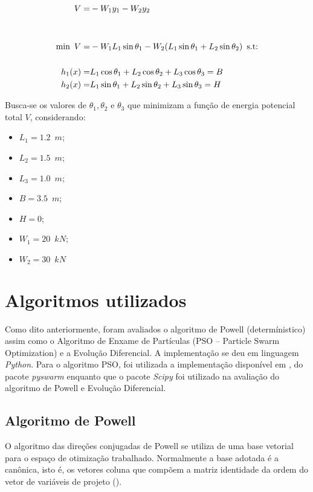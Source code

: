 \documentclass{article}
\begin{document}
\begin{equation}
\begin{split}
V = & -W_1 y_1 - W_2 y_2 \\
\phantom{0} & \phantom{0} \\
\phantom{0} & \phantom{0} \\
\text{min\phantom{0}}V = & -W_1 L_1 \sin \theta_1 - W_2 (L_1 \sin \theta_1 + L_2 \sin \theta_2) \phantom{0}\text{s.t:} \\
\phantom{0} & \phantom{0} \\
h_1(x) = & L_1 \cos \theta_1 + L_2 \cos \theta_2 + L_3 \cos \theta_3  = B \\
h_2(x) = & L_1 \sin \theta_1 + L_2 \sin \theta_2 + L_3 \sin \theta_3  = H \\
\end{split}
\end{equation}

Busca-se os valores de $\theta_1, \theta_2$ e $\theta_3$ que minimizam a função de energia potencial total $V$, considerando:

\begin{itemize}
\item $L_1 = 1.2 \phantom{0} m$;
\item $L_2 = 1.5 \phantom{0} m$;
\item $L_3 = 1.0 \phantom{0} m$;
\item $B = 3.5 \phantom{0} m$;
\item $H = 0$;
\item $W_1 = 20 \phantom{0} kN$;
\item $W_2 = 30 \phantom{0} kN$
\end{itemize}
\section{Algoritmos utilizados}
Como dito anteriormente, foram avaliados o algoritmo de Powell (determínistico) assim como o Algoritmo de Enxame de Partículas (PSO -- Particle Swarm Optimization) e a Evolução Diferencial. A implementação se deu em linguagem \textit{Python}. Para o algoritmo PSO, foi utilizada a implementação disponível em \cite{miranda2018pyswarms}, do pacote \textit{pyswarm} enquanto que o pacote \textit{Scipy} \cite{christensen2015learning} foi utilizado na avaliação do algoritmo de Powell e Evolução Diferencial. 
\subsection{Algoritmo de Powell}
O algoritmo das direções conjugadas de Powell se utiliza de uma base vetorial para o espaço de otimização
trabalhado. Normalmente a base adotada é a canônica, isto é, os vetores coluna que
compõem a matriz identidade da ordem do vetor de variáveis de projeto (\cite{fletcher1964function}). \newline
\end{document}
